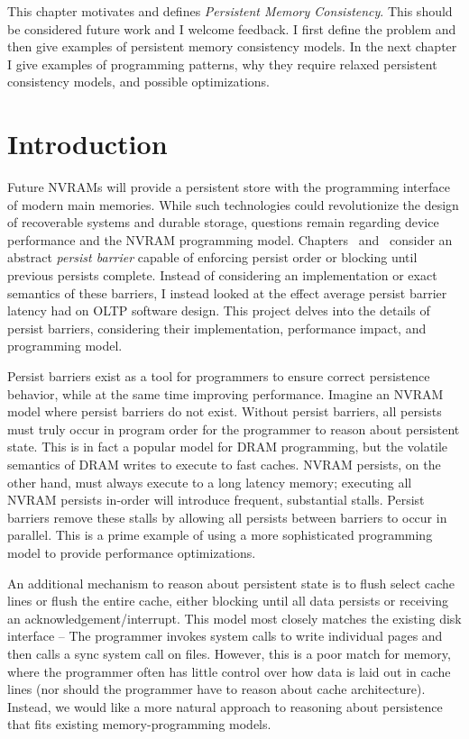 This chapter motivates and defines \emph{Persistent Memory Consistency}.
This should be considered future work and I welcome feedback.
I first define the problem and then give examples of persistent memory consistency models.
In the next chapter I give examples of programming patterns, why they require relaxed persistent consistency models, and possible optimizations.

\section{Introduction}
\label{sec:PMC:Intro}

Future NVRAMs will provide a persistent store with the programming interface of modern main memories.
While such technologies could revolutionize the design of recoverable systems and durable storage, questions remain regarding device performance and the NVRAM programming model.
Chapters~ and~ consider an abstract \emph{persist barrier} capable of enforcing persist order or blocking until previous persists complete.
Instead of considering an implementation or exact semantics of these barriers, I instead looked at the effect average persist barrier latency had on OLTP software design.
This project delves into the details of persist barriers, considering their implementation, performance impact, and programming model.

Persist barriers exist as a tool for programmers to ensure correct persistence behavior, while at the same time improving performance.
Imagine an NVRAM model where persist barriers do not exist.
Without persist barriers, all persists must truly occur in program order for the programmer to reason about persistent state.
This is in fact a popular model for DRAM programming, but the volatile semantics of DRAM writes to execute to fast caches.
NVRAM persists, on the other hand, must always execute to a long latency memory; executing all NVRAM persists in-order will introduce frequent, substantial stalls.
Persist barriers remove these stalls by allowing all persists between barriers to occur in parallel.
This is a prime example of using a more sophisticated programming model to provide performance optimizations.

An additional mechanism to reason about persistent state is to flush select cache lines or flush the entire cache, either blocking until all data persists or receiving an acknowledgement/interrupt.
This model most closely matches the existing disk interface -- The programmer invokes system calls to write individual pages and then calls a sync system call on files.
However, this is a poor match for memory, where the programmer often has little control over how data is laid out in cache lines (nor should the programmer have to reason about cache architecture).
Instead, we would like a more natural approach to reasoning about persistence that fits existing memory-programming models.

